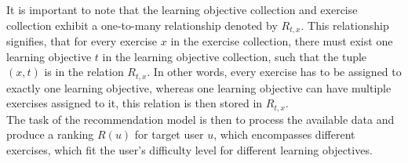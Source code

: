 \documentclass{Academic}
\begin{document}
        It is important to note that the learning objective collection and exercise collection exhibit a one-to-many relationship denoted by $R_{t,x}$. This relationship signifies, that for every exercise $x$ in the exercise collection, there must exist one learning objective $t$ in the learning objective collection, such that the tuple $(x,t)$ is in the relation $R_{t,x}$. In other words, every exercise has to be assigned to exactly one learning objective, whereas one learning objective can have multiple exercises assigned to it, this relation is then stored in $R_{t,x}$.\\
        The task of the recommendation model is then to process the available data and produce a ranking $R(u)$ for target user $u$, which encompasses different exercises, which fit the user's difficulty level for different learning objectives.
        
        \FloatBarrier
\end{document}

